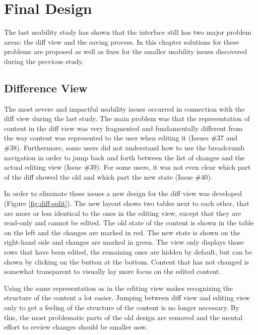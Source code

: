 \chapter{Final Design} \label{chapter:final-design}
The last usability study has shown that the interface still has two major problem areas: the diff view and the saving process. In this chapter solutions for these problems are proposed as well as fixes for the smaller usability issues discovered during the previous study.

\section{Difference View}
The most severe and impactful usability issues occurred in connection with the diff view during the last study. The main problem was that the representation of content in the diff view was very fragmented and fundamentally different from the way content was represented to the user when editing it (Issues \#37 and \#38). Furthermore, some users did not understand how to use the breadcrumb navigation in order to jump back and forth between the list of changes and the actual editing view (Issue \#39). For some users, it was not even clear which part of the diff showed the old and which part the new state (Issue \#40).

In order to eliminate these issues a new design for the diff view was developed (Figure \ref{fig:diff-split}). The new layout shows two tables next to each other, that are more or less identical to the ones in the editing view, except that they are read-only and cannot be edited. The old state of the content is shown in the table on the left and the changes are marked in red. The new state is shown on the right-hand side and changes are marked in green. The view only displays those rows that have been edited, the remaining ones are hidden by default, but can be shown by clicking on the button at the bottom. Content that has not changed is somewhat transparent to visually lay more focus on the edited content.

Using the same representation as in the editing view makes recognizing the structure of the content a lot easier. Jumping between diff view and editing view only to get a feeling of the structure of the content is no longer necessary. By this, the most problematic parts of the old design are removed and the mental effort to review changes should be smaller now.



